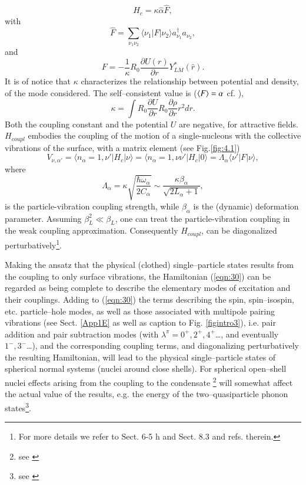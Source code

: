 \begin{equation}\label{eqintroD2}
H_{c} = \kappa \hat{\alpha} \hat{F} ,
\end{equation}
with
\begin{equation}
\hat{F} = \sum_{\nu_1 \nu_2} \langle \nu_1|F|\nu_2 \rangle a_{\nu_1}^{\dagger} a_{\nu_2} ,
\label{eqn:32}
\end{equation}
and
\begin{equation}
F = - \frac{1}{\kappa} R_0 \frac{\partial U(r)}{\partial r} Y_{LM}^* (\hat{r}) .
\label{eqn:33}
\end{equation}
It is of notice that $\kappa$ characterizes the relationship between potential and density, of the mode considered. The self--consistent value is ($\langle {F} \rangle=\alpha$ cf. \cite{Bohr:75}), 
\begin{equation}
\kappa=\int R_0\frac{\partial U}{\partial r}R_0\frac{\partial \rho}{\partial r}r^2dr.
\end{equation}
Both the coupling constant and the potential $U$ are negative, for attractive fields.
 $H_{coupl}$ embodies the coupling of the motion of a single-nucleons with the collective vibrations of the surface, with a matrix element (see Fig.\ref{fig:4.1})
\begin{equation}
V_{\nu,\alpha'}=\langle n_{\alpha} = 1, \nu' |H_{c}|\nu \rangle  = \langle n_{\alpha}=1, \nu\nu'|H_{c}|0 \rangle= \Lambda_{\alpha} \langle \nu' |F|\nu \rangle ,
\label{eqn:34}
\end{equation}
where
\begin{equation}\label{eqintroD6}
\Lambda_{\alpha} = \kappa \sqrt{\frac{\hbar\omega_{\alpha}}{2C_{\alpha}}} \sim \frac{\kappa \beta_{\alpha}}{\sqrt{2L_{\alpha}+1}} ,
\end{equation}
is the particle-vibration coupling strength, while $\beta_\alpha$ is the (dynamic) deformation parameter. Assuming $\beta_L^2 \ll \beta_L$, one can  treat the particle-vibration coupling in the weak coupling approximation. Consequently $H_{coupl}$, can be diagonalized perturbatively\footnote{For more details we refer to \cite{Bohr:75} Sect. 6-5 h and \cite{Brink:05} Sect. 8.3 and refs. therein.}.

Making the ansatz that the physical (clothed) single--particle states results from the coupling to only surface vibrations, the Hamiltonian (\ref{eqn:30}) can be regarded as being complete to describe the elementary modes of excitation and their couplings. Adding to (\ref{eqn:30}) the terms describing the spin, spin--isospin, etc. particle--hole modes, as well as those associated with multipole pairing vibrations (see Sect. \ref{App1E} as well as caption to Fig. \ref{figintro3}), i.e. pair addition and pair subtraction modes (with $\lambda^\pi=0^+,2^+,4^+$\dots, and eventually $1^-,3^-$\dots), and the corresponding coupling terms, and diagonalizing perturbatively the resulting Hamiltonian, will lead to the physical single--particle states of spherical normal systems (nuclei around close shells). For spherical open--shell nuclei effects arising from the coupling to the condensate \footnote{see \cite{Bes:90}} will somewhat  affect the actual value of the results, e.g. the energy of the two--quasiparticle phonon states\footnote{see \cite{Barranco:04}}.  
